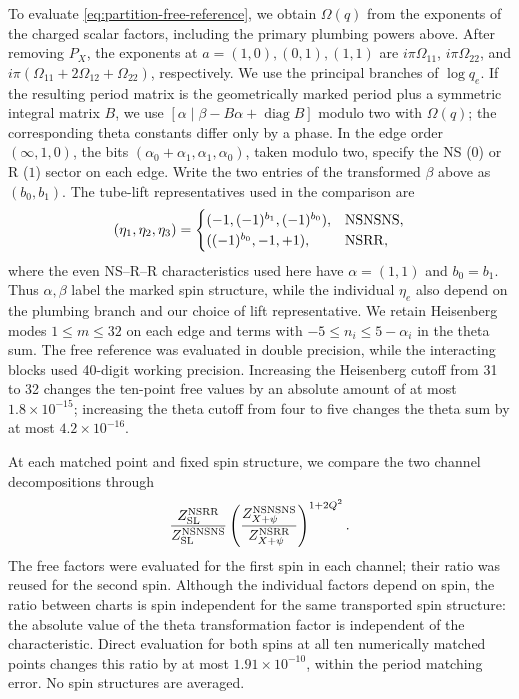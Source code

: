 To evaluate \eqref{eq:partition-free-reference}, we obtain $\Omega(q)$
from the exponents of the charged scalar factors, including the primary
plumbing powers above. After removing $P_X$, the exponents at
$a=(1,0),(0,1),(1,1)$ are $i\pi\Omega_{11}$,
$i\pi\Omega_{22}$, and
$i\pi(\Omega_{11}+2\Omega_{12}+\Omega_{22})$, respectively.
We use the principal branches of $\log q_e$. If the resulting period
matrix is the geometrically marked period plus a symmetric integral
matrix $B$, we use
$[\alpha\mid\beta-B\alpha+\operatorname{diag}B]$ modulo two with
$\Omega(q)$; the corresponding theta constants differ only by a
phase. In the edge order $(\infty,1,0)$, the bits
$(\alpha_0+\alpha_1,\alpha_1,\alpha_0)$, taken modulo two, specify
the NS ($0$) or R ($1$) sector on each edge. Write the two entries
of the transformed $\beta$ above as $(b_0,b_1)$. The tube-lift
representatives used in the comparison are
\begin{equation}
 (\eta_1,\eta_2,\eta_3)=
 \begin{cases}
 (-1,(-1)^{b_1},(-1)^{b_0}),&\mathrm{NS}\mathrm{NS}\mathrm{NS},\\
 ((-1)^{b_0},-1,+1),&\mathrm{NS}\mathrm R\mathrm R,
 \end{cases}
 \label{eq:partition-characteristic-lifts}
\end{equation}
where the even NS--R--R characteristics used here have
$\alpha=(1,1)$ and $b_0=b_1$. Thus $\alpha,\beta$ label the
marked spin structure, while the individual $\eta_e$ also depend
on the plumbing branch and our choice of lift representative.
We retain Heisenberg modes $1\leq m\leq32$ on each edge and
terms with $-5\leq n_i\leq5-\alpha_i$ in the theta sum.
The free reference was evaluated in double precision, while the
interacting blocks used 40-digit working precision. Increasing the
Heisenberg cutoff from 31 to 32 changes the ten-point free values by
an absolute amount of at most $1.8\times10^{-15}$; increasing the
theta cutoff from four to five changes the theta sum by at most
$4.2\times10^{-16}$.

At each matched point and fixed spin structure, we compare the two
channel decompositions through
\begin{equation}
 \frac{Z_{\mathrm{SL}}^{\mathrm{NS}\mathrm R\mathrm R}}
      {Z_{\mathrm{SL}}^{\mathrm{NS}\mathrm{NS}\mathrm{NS}}}
 \left(\frac{Z_{X+\psi}^{\mathrm{NS}\mathrm{NS}\mathrm{NS}}}
            {Z_{X+\psi}^{\mathrm{NS}\mathrm R\mathrm R}}\right)^{1+2Q^2}.
 \label{eq:partition-free-frame-comparison}
\end{equation}
The free factors were evaluated for the first spin in each channel;
their ratio was reused for the second spin. Although the individual
factors depend on spin, the ratio between charts is spin independent
for the same transported spin structure: the absolute value of the theta
transformation factor is independent of the characteristic. Direct
evaluation for both spins at all ten numerically matched points
changes this ratio by at most $1.91\times10^{-10}$, within the period
matching error. No spin structures are averaged.

